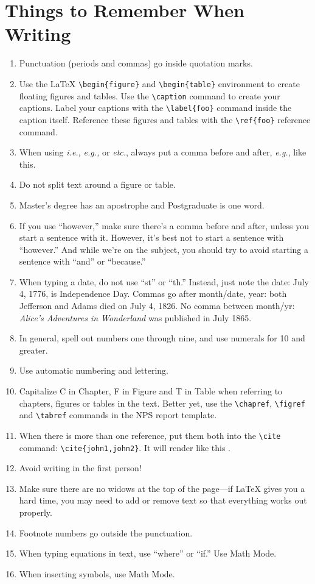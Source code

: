 \section{Things to Remember When Writing}\label{sec:remember}
\begin{enumerate}
\item Punctuation (periods and commas) go inside quotation marks. 
\item Use the \LaTeX{} \verb+\begin{figure}+ and \verb+\begin{table}+ environment to
  create floating figures and tables. Use the \verb+\caption+ command
  to create your captions. Label your captions with the
  \verb+\label{foo}+ command inside the caption itself. Reference
  these figures and tables with the \verb+\ref{foo}+ reference command.
\item When using \emph{i.e.,} \emph{e.g.,} or \emph{etc.}, always put
  a comma before and after, \emph{e.g.}, like this.
\item Do not split text around a figure or table. 
\item Master's degree has an apostrophe and Postgraduate is one word. 
\item If you use ``however,'' make sure there's a comma before and after,
unless you 
start a sentence with it. However, it's best not to start a sentence
with ``however.'' And while we're on the subject, you should try to avoid starting a sentence with ``and'' or ``because.'' 
\item When typing a date, do not use ``st'' or ``th.'' Instead, just
  note the date: July 4, 1776, is Independence Day. Commas go 
after month/date, year: both Jefferson and Adams died on July 4, 1826.
No comma between month/yr: \textit{Alice's Adventures in Wonderland} was published in July 1865.
\item In general, spell out numbers one through nine, and use numerals for 10 and greater.
\item Use automatic numbering and lettering.
\item Capitalize C in Chapter, F in Figure and T in Table when referring
to chapters, figures or tables in the text. Better yet, use the \verb+\chapref+,
\verb+\figref+ and \verb+\tabref+ commands in the NPS report template.
\item When there is more than one reference, put them both into the \verb+\cite+ command: \verb+\cite{john1,john2}+. It will render like this \cite{IEEEhowto:IEEEtranpage,IEEEexample:shellCTANpage}.
\item Avoid writing in the first person!
\item Make sure there are no widows at the
  top of the page---if \LaTeX{} gives you a hard time, you may need to
  add or remove text so that everything works out properly.
\item Footnote numbers go outside the punctuation. 
\item When typing equations in text, use ``where'' or ``if.'' Use
  Math Mode. 
\item When inserting symbols, use Math Mode.
\end{enumerate}
